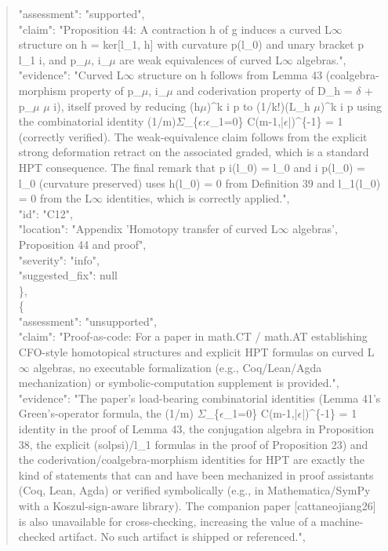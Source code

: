 \documentclass[11pt]{article}
\begin{document}
\begin{quote}
      "assessment": "supported",\\
      "claim": "Proposition 44: A contraction h of g induces a curved L\ensuremath{\infty} structure on h = ker[l\_1, h] with curvature p(l\_0) and unary bracket p l\_1 i, and p\_\ensuremath{\mu}, i\_\ensuremath{\mu} are weak equivalences of curved L\ensuremath{\infty} algebras.",\\
      "evidence": "Curved L\ensuremath{\infty} structure on h follows from Lemma 43 (coalgebra-morphism property of p\_\ensuremath{\mu}, i\_\ensuremath{\mu} and coderivation property of D\_h = \ensuremath{\delta} + p\_\ensuremath{\mu} \ensuremath{\mu} i), itself proved by reducing (h\ensuremath{\mu})\^{}k i p to (1/k!)(L\_h \ensuremath{\mu})\^{}k i p using the combinatorial identity (1/m)\ensuremath{\Sigma}\_\{\ensuremath{\epsilon}:\ensuremath{\epsilon}\_1=0\} C(m-1,|\ensuremath{\epsilon}|)\^{}\{-1\} = 1 (correctly verified). The weak-equivalence claim follows from the explicit strong deformation retract on the associated graded, which is a standard HPT consequence. The final remark that p i(l\_0) = l\_0 and i p(l\_0) = l\_0 (curvature preserved) uses h(l\_0) = 0 from Definition 39 and l\_1(l\_0) = 0 from the L\ensuremath{\infty} identities, which is correctly applied.",\\
      "id": "C12",\\
      "location": "Appendix 'Homotopy transfer of curved L\ensuremath{\infty} algebras', Proposition 44 and proof",\\
      "severity": "info",\\
      "suggested\_fix": null\\
    \},\\
    \{\\
      "assessment": "unsupported",\\
      "claim": "Proof-as-code: For a paper in math.CT / math.AT establishing CFO-style homotopical structures and explicit HPT formulas on curved L\ensuremath{\infty} algebras, no executable formalization (e.g., Coq/Lean/Agda mechanization) or symbolic-computation supplement is provided.",\\
      "evidence": "The paper's load-bearing combinatorial identities (Lemma 41's Green's-operator formula, the (1/m) \ensuremath{\Sigma}\_\{\ensuremath{\epsilon}\_1=0\} C(m-1,|\ensuremath{\epsilon}|)\^{}\{-1\} = 1 identity in the proof of Lemma 43, the conjugation algebra in Proposition 38, the explicit (solpsi)/l\_1 formulas in the proof of Proposition 23) and the coderivation/coalgebra-morphism identities for HPT are exactly the kind of statements that can and have been mechanized in proof assistants (Coq, Lean, Agda) or verified symbolically (e.g., in Mathematica/SymPy with a Koszul-sign-aware library). The companion paper [cattaneojiang26] is also unavailable for cross-checking, increasing the value of a machine-checked artifact. No such artifact is shipped or referenced.",\\

\end{quote}
\end{document}
